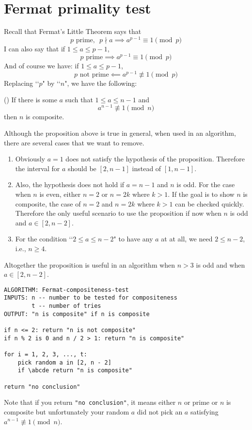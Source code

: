 \newcommand\abcde{$\texttt{a}^\texttt{n - 1} \not\equiv \texttt{1} \ \texttt{(mod n)}$}

\section{Fermat primality test}

Recall that Fermat's Little Theorem says
that 
\[
  \text{$p$ prime}, \,\,\,
  p \nmid a \implies a^{p-1} \equiv 1 \pmod{p}
\]
I can also say that if $1 \leq a \leq p - 1$,
\[
\text{$p$ prime}
\implies
a^{p-1} \equiv 1 \pmod{p}
\]
And of course we have:
if
$1 \leq a \leq p - 1$,
\[
\text{$p$ not prime}
\impliedby
a^{p-1} \not\equiv 1 \pmod{p}
\]
Replacing \lq\lq $p$" by \lq\lq $n$",
we have the following:

\begin{prop} \textnormal{()}
If there is some $a$ such that $1 \leq a \leq n - 1$ and 
\[
a^{n-1} \not\equiv 1 \pmod{n}
\]
then $n$ is composite.
\end{prop}

Although the proposition above is true in general,
when used in an algorithm, there are several cases that we want to remove.
\begin{enumerate}[nosep]
\item
  Obviously $a = 1$ does not satisfy the hypothesis of the proposition.
  Therefore the interval for $a$ should be $[2, n-1]$ instead of $[1, n-1]$.
\item
  Also, the hypothesis does not hold if $a = n-1$ and $n$ is odd.
  For the case when $n$ is even, either $n = 2$ or $n = 2k$ where $k > 1$.
  If the goal is to show $n$ is composite, the case of $n = 2$ and
  $n = 2k$ where $k > 1$ can be checked quickly.
  Therefore the only useful scenario to use the proposition if now
  when $n$ is odd and $a \in [2, n-2]$.
\item
  For the condition \lq\lq $2 \leq a \leq n - 2$" to have any $a$ at
  at all, we need $2 \leq n - 2$, i.e., $n \geq 4$.
\end{enumerate}
Altogether the proposition is useful in an algorithm
when $n > 3$ is odd and when $a \in [2, n - 2]$.

\begin{Verbatim}[frame=single,fontsize=\footnotesize,commandchars=\\\{\}]
ALGORITHM: Fermat-compositeness-test
INPUTS: n -- number to be tested for compositeness
        t -- number of tries
OUTPUT: "n is composite" if n is composite

if n <= 2: return "n is not composite"
if n % 2 is 0 and n / 2 > 1: return "n is composite"

for i = 1, 2, 3, ..., t:
    pick random a in [2, n - 2]
    if \abcde return "n is composite"

return "no conclusion"
\end{Verbatim}
Note that if you return \verb!"no conclusion"!, it means either $n$
or prime or $n$ is composite but unfortunately your random
$a$ did not pick an $a$ satisfying
$a^{n-1} \not\equiv 1 \pmod{n}$.

